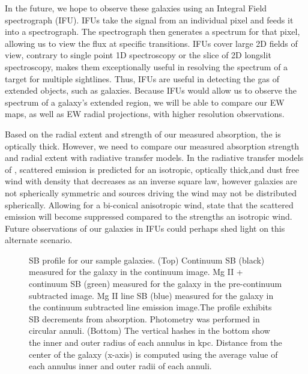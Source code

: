 \documentclass[twocolumn]{aastex61}
\begin{document}
In the future, we hope to observe these galaxies using an Integral Field spectrograph (IFU). IFUs take the signal from an individual pixel and feeds it into a spectrograph. The spectrograph then generates a spectrum for that pixel, allowing us to view the flux at specific transitions. IFUs cover large 2D fields of view, contrary to single point 1D spectroscopy or the slice of 2D longslit spectroscopy, makes them exceptionally useful in resolving the spectrum of a target for multiple sightlines. Thus, IFUs are useful in detecting the gas of extended objects, such as galaxies. Because IFUs would allow us to observe the spectrum of a galaxy's extended region, we will be able to compare our EW maps, as well as EW radial projections, with higher resolution observations. 

Based on the radial extent and strength of our measured  absorption, the  is optically thick. However, we need to compare our measured absorption strength and radial extent with radiative transfer models. In the radiative transfer models of \cite{Prochaska_2011}, scattered emission is predicted for an isotropic, optically thick,and dust free wind with density that decreases as an inverse square law, however galaxies are not spherically symmetric and sources driving the wind may not be distributed spherically. Allowing for a bi-conical anisotropic wind, \cite{Prochaska_2011} state that the scattered  emission will become suppressed compared to the strengths an isotropic wind. Future observations of our galaxies in IFUs could perhaps shed light on this alternate scenario.



\begin{figure}
\centering
{}
\caption{SB profile for our sample galaxies. (Top) Continuum SB (black) measured for the galaxy in the continuum image. Mg II + continuum SB (green) measured for the galaxy in the pre-continuum subtracted image. Mg II line SB (blue) measured for the galaxy in the continuum subtracted line emission image.The profile exhibits SB decrements from  absorption. Photometry was performed in circular annuli. (Bottom) The vertical hashes in the bottom show the inner and outer radius of each annulus in kpc. Distance from the center of the galaxy (x-axis) is computed using the average value of each annulus inner and outer radii of each annuli.}
\label{fig:sb_profiles}
\end{figure}
\end{document}
